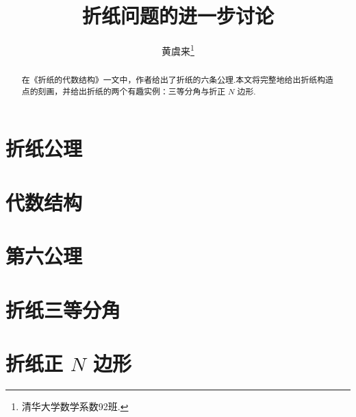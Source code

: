 \documentclass[twoside]{article}
\begin{document}
\title{折纸问题的进一步讨论}
\author{黄虞来\footnote{清华大学数学系数92班.}}

\begin{abstract}
    在《折纸的代数结构》\cite{Hesi}一文中，作者给出了折纸的六条公理.本文将完整地给出折纸构造点的刻画，并给出折纸的两个有趣实例：三等分角与折正 $N$ 边形.
\end{abstract}

\section{折纸公理}



\section{代数结构}



\section{第六公理}



\section{折纸三等分角}



\section{折纸正 \texorpdfstring{$N$}{N} 边形}



\printbibliography
\end{document}
